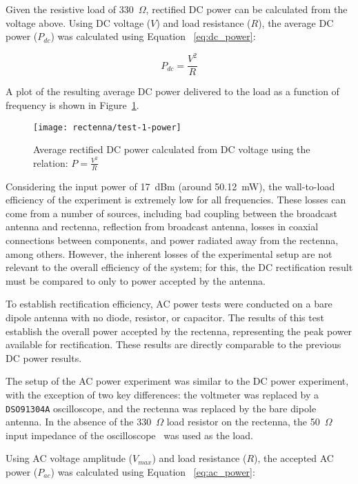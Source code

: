 Given the resistive load of 330~$\Omega$, rectified DC power can be calculated from the voltage above. Using DC voltage ($V$) and load resistance ($R$), the average DC power ($P_{dc}$) was calculated using Equation ~\ref{eq:dc_power}:

\begin{equation}
P_{dc} = \frac{V^2}{R}
\label{eq:dc_power}
\end{equation}

A plot of the resulting average DC power delivered to the load as a function of frequency is shown in Figure~\ref{fig:rectenna-test-1-power}.

\begin{figure}[]
\centering
\texttt{[image: rectenna/test-1-power]}
    \caption[Rectified DC power]{Average rectified DC power calculated from DC voltage using the relation: $P = \frac{V^2}{R}$}
    \label{fig:rectenna-test-1-power}
\end{figure}


Considering the input power of 17~dBm (around 50.12~mW), the wall-to-load efficiency of the experiment is extremely low for all frequencies. These losses can come from a number of sources, including bad coupling between the broadcast antenna and rectenna, reflection from broadcast antenna, losses in coaxial connections between components, and power radiated away from the rectenna, among others. However, the inherent losses of the experimental setup are not relevant to the overall efficiency of the system; for this, the DC rectification result must be compared to only to power accepted by the antenna.

To establish rectification efficiency, AC power tests were conducted on a bare dipole antenna with no diode, resistor, or capacitor. The results of this test establish the overall power accepted by the rectenna, representing the peak power available for rectification. These results are directly comparable to the previous DC power results.

The setup of the AC power experiment was similar to the DC power experiment, with the exception of two key differences: the voltmeter was replaced by a \texttt{DSO91304A} oscilloscope, and the rectenna was replaced by the bare dipole antenna. In the absence of the 330~$\Omega$ load resistor on the rectenna, the 50~$\Omega$ input impedance of the oscilloscope~\cite{DSO91304A-manual} was used as the load.

Using AC voltage amplitude ($V_{max}$) and load resistance ($R$), the accepted AC power ($P_{ac}$) was calculated using Equation ~\ref{eq:ac_power}:

